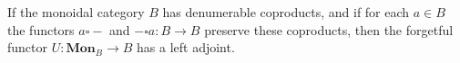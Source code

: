 If the monoidal category $B$ has denumerable coproducts, and if for each $a \in B$ the functors $a \square -$ and $- \square a : B \rightarrow B$ preserve these coproducts, then the forgetful functor $U : \mathbf{Mon}_B \rightarrow B$ has a left adjoint.
